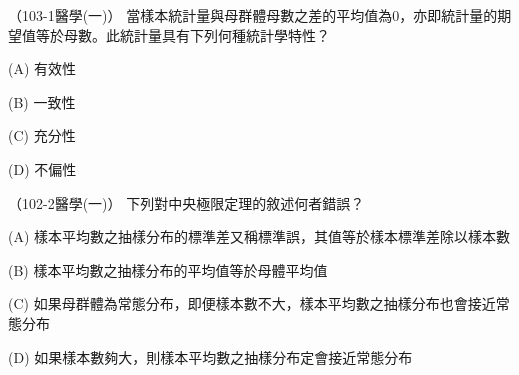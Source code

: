     \begin{docexam}{（103-1醫學(一)）}
        當樣本統計量與母群體母數之差的平均值為0，亦即統計量的期望值等於母數。此統計量具有下列何種統計學特性？
        
        (A) 有效性
        
        (B) 一致性
        
        (C) 充分性
        
        (D) 不偏性
    \end{docexam}

    \begin{docexam}{（102-2醫學(一)）}
        下列對中央極限定理的敘述何者錯誤？
        
        (A) 樣本平均數之抽樣分布的標準差又稱標準誤，其值等於樣本標準差除以樣本數
        
        (B) 樣本平均數之抽樣分布的平均值等於母體平均值
        
        (C) 如果母群體為常態分布，即便樣本數不大，樣本平均數之抽樣分布也會接近常態分布
        
        (D) 如果樣本數夠大，則樣本平均數之抽樣分布定會接近常態分布
    \end{docexam}